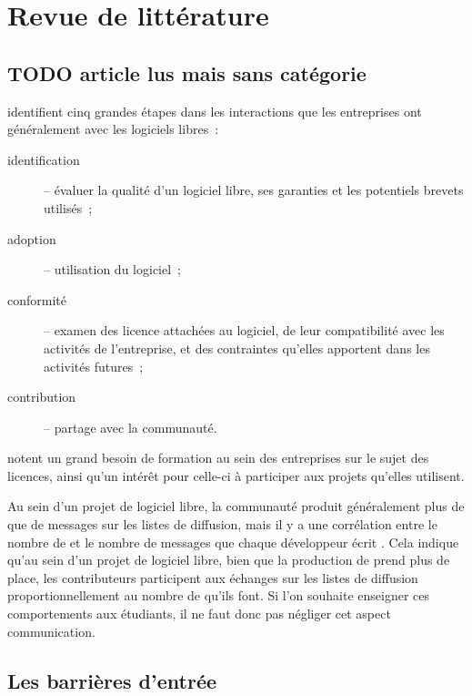 \chapter{Revue de littérature}

\section{TODO article lus mais sans catégorie}

 identifient cinq grandes étapes dans les interactions que les entreprises ont
généralement avec les logiciels libres :
\begin{description}
    \item[identification] -- évaluer la qualité d'un logiciel libre, ses garanties et les potentiels brevets
        utilisés ;
    \item[adoption] -- utilisation du logiciel ;
    \item[conformité] -- examen des licence attachées au logiciel, de leur compatibilité avec les activités de
        l'entreprise, et des contraintes qu'elles apportent dans les activités futures ;
    \item[contribution] -- partage avec la communauté.
\end{description}

\textcite{strategies-2012} notent un grand besoin de formation au sein des entreprises sur le sujet des
licences, ainsi qu'un intérêt pour celle-ci à participer aux projets qu'elles utilisent.

Au sein d'un projet de logiciel libre, la communauté produit généralement plus de  que de
messages sur les listes de diffusion, mais il y a une corrélation entre le nombre de  et le
nombre de messages que chaque développeur écrit . Cela indique qu'au
sein d'un projet de logiciel libre, bien que la production de  prend plus de place, les
contributeurs participent aux échanges sur les listes de diffusion proportionnellement au nombre de
 qu'ils font. Si l'on souhaite enseigner ces comportements aux étudiants, il ne faut donc pas
négliger cet aspect communication.

\section{Les barrières d'entrée}

